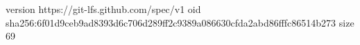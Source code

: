 version https://git-lfs.github.com/spec/v1
oid sha256:6f01d9ceb9ad8393d6c706d289ff2c9389a086630cfda2abd86fffc86514b273
size 69
